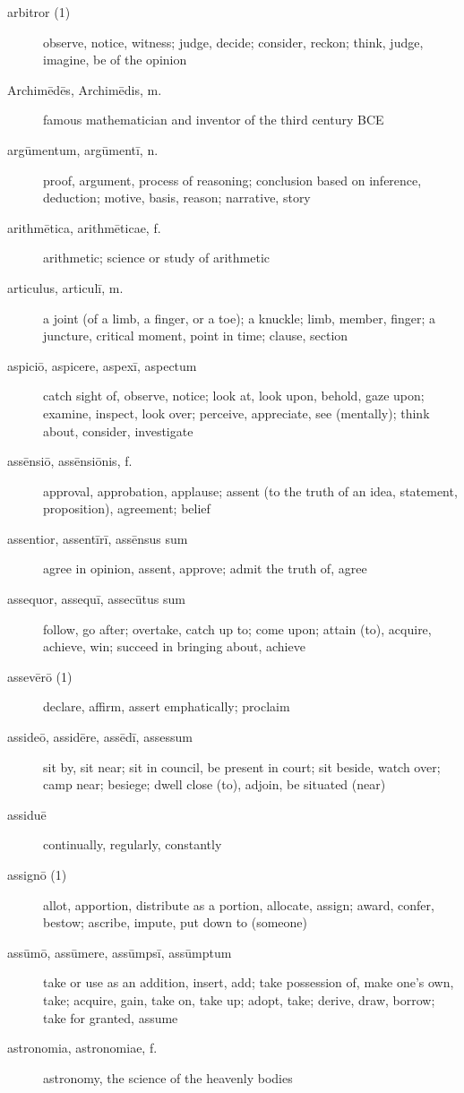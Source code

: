 \begin{description}
    \item[arbitror (1)] \marginnote{*}observe, notice, witness; judge, decide; consider, reckon; think, judge, imagine, be of the opinion
    \item[Archimēdēs, Archimēdis, m.] famous mathematician and inventor of the third century BCE
    \item[argūmentum, argūmentī, n.] proof, argument, process of reasoning; conclusion based on inference, deduction; motive, basis, reason; narrative, story
    \item[arithmētica, arithmēticae, f.] arithmetic; science or study of arithmetic
    \item[articulus, articulī, m.] a joint (of a limb, a finger, or a toe); a knuckle; limb, member, finger; a juncture, critical moment, point in time; clause, section
    \item[aspiciō, aspicere, aspexī, aspectum] \marginnote{*}catch sight of, observe, notice; look at, look upon, behold, gaze upon; examine, inspect, look over; perceive, appreciate, see (mentally); think about, consider, investigate
    \item[assēnsiō, assēnsiōnis, f.] approval, approbation, applause; assent (to the truth of an idea, statement, proposition), agreement; belief
    \item[assentior, assentīrī, assēnsus sum] agree in opinion, assent, approve; admit the truth of, agree
    \item[assequor, assequī, assecūtus sum] follow, go after; overtake, catch up to; come upon; attain (to), acquire, achieve, win; succeed in bringing about, achieve
    \item[assevērō (1)] declare, affirm, assert emphatically; proclaim
    \item[assideō, assidēre, assēdī, assessum] sit by, sit near; sit in council, be present in court; sit beside, watch over; camp near; besiege; dwell close (to), adjoin, be situated (near)
    \item[assiduē] continually, regularly, constantly
    \item[assignō (1)] allot, apportion, distribute as a portion, allocate, assign; award, confer, bestow; ascribe, impute, put down to (someone)
    \item[assūmō, assūmere, assūmpsī, assūmptum] take or use as an addition, insert, add; take possession of, make one's own, take; acquire, gain, take on, take up; adopt, take; derive, draw, borrow; take for granted, assume
    \item[astronomia, astronomiae, f.] astronomy, the science of the heavenly bodies

\end{description}
